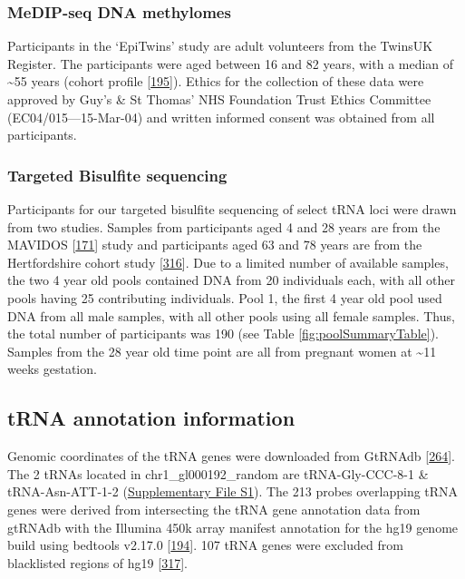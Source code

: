 \documentclass[
]{book}
\begin{document}
\hypertarget{medip-seq-dna-methylomes}{%
\subsubsection{MeDIP-seq DNA methylomes}\label{medip-seq-dna-methylomes}}

Participants in the `EpiTwins' study are adult volunteers from the TwinsUK Register.
The participants were aged between 16 and 82 years, with a median of \textasciitilde55 years (cohort profile {[}\protect\hyperlink{ref-Moayyeri2013}{195}{]}).
Ethics for the collection of these data were approved by Guy's \& St Thomas' NHS Foundation Trust Ethics Committee (EC04/015---15-Mar-04) and written informed consent was obtained from all participants.

\hypertarget{targeted-bisulfite-sequencing}{%
\subsubsection{Targeted Bisulfite sequencing}\label{targeted-bisulfite-sequencing}}

Participants for our targeted bisulfite sequencing of select tRNA loci were drawn from two studies.
Samples from participants aged 4 and 28 years are from the MAVIDOS {[}\protect\hyperlink{ref-Harvey2012a}{171}{]} study and participants aged 63 and 78 years are from the Hertfordshire cohort study {[}\protect\hyperlink{ref-Syddall2005}{316}{]}.
Due to a limited number of available samples, the two 4 year old pools contained DNA from 20 individuals each, with all other pools having 25 contributing individuals.
Pool 1, the first 4 year old pool used DNA from all male samples, with all other pools using all female samples.
Thus, the total number of participants was 190 (see Table \ref{fig:poolSummaryTable}).
Samples from the 28 year old time point are all from pregnant women at \textasciitilde11 weeks gestation.

\hypertarget{tRNAanno}{%
\subsection{tRNA annotation information}\label{tRNAanno}}

Genomic coordinates of the tRNA genes were downloaded from GtRNAdb {[}\protect\hyperlink{ref-Chan2009}{264}{]}.
The 2 tRNAs located in chr1\_gl000192\_random are tRNA-Gly-CCC-8-1 \& tRNA-Asn-ATT-1-2 (\href{./Supplementary_Files/hg19-tRNAs.bed}{Supplementary File S1}).
The 213 probes overlapping tRNA genes were derived from intersecting the tRNA gene annotation data from gtRNAdb with the Illumina 450k array manifest annotation for the hg19 genome build using bedtools v2.17.0 {[}\protect\hyperlink{ref-Quinlan2010}{194}{]}.
107 tRNA genes were excluded from blacklisted regions of hg19 {[}\protect\hyperlink{ref-Amemiya2019}{317}{]}.
\end{document}
